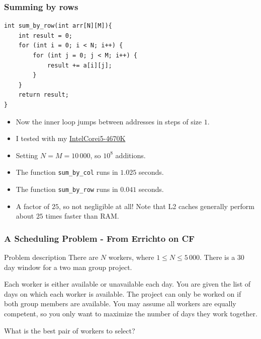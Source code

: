 \documentclass[10pt]{beamer}
\begin{document}
\begin{frame}
    \frametitle{Summing by rows}
    \begin{scriptsize}
        \begin{verbatim}
int sum_by_row(int arr[N][M]){
    int result = 0;
    for (int i = 0; i < N; i++) {
        for (int j = 0; j < M; i++) {
            result += a[i][j];
        }
    }
    return result;
}
        \end{verbatim}
    \end{scriptsize}
    \begin{itemize}
        \item<1-> Now the inner loop jumps between addresses in steps of size $1$. 
        \item<2-> I tested with my \href{https://www.intel.com/content/www/us/en/products/sku/75048/intel-core-i54670k-processor-6m-cache-up-to-3-80-ghz/specifications.html}{Intel\textregistered Core\texttrademark i5-4670K}
        \item<3-> Setting $N = M = 10\,000$, so $10^8$ additions.
        \item<4-> The function \texttt{sum\_by\_col} runs in $1.025$ seconds.
        \item<5-> The function \texttt{sum\_by\_row} runs in $0.041$ seconds.
        \item<6-> A factor of $25$, so not negligible at all! Note that L2 caches generally perform about $25$ times faster than RAM.
    \end{itemize}
\end{frame}

\begin{frame}[plain]
	\frametitle{A Scheduling Problem - From Errichto on CF}
	\begin{block}{Problem description}
        There are $N$ workers, where $1 \leq N \leq 5\,000$.
        There is a $30$ day window for a two man group project.

        Each worker is either available or unavailable each day.
        You are given the list of days on which each worker is available.
        The project can only be worked on if both group members are available.
        You may assume all workers are equally competent, so you only want to maximize the number of days they work together.

        What is the best pair of workers to select?
    \end{block}
\end{frame}
\end{document}
